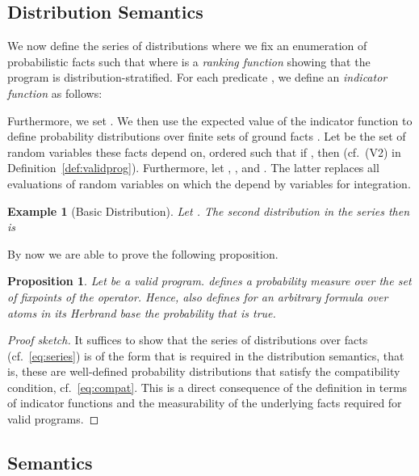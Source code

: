\documentclass{tlp}
\newtheorem{example}{Example}
\newtheorem{proposition}{Proposition}
\begin{document}
\subsection{Distribution Semantics}
\label{sec:distributionsemantics}

We now define the series of distributions  where we fix an
enumeration  of probabilistic facts such that  where  is a
\emph{ranking function} showing that the program is
distribution-stratified.  For each predicate , we define an \emph{indicator function} as follows:


Furthermore, we set .
We then use the expected value of the indicator function to define
probability distributions  over finite sets of ground facts
. Let  be the set of random
variables these  facts depend on, ordered such that if
, then  (cf.~(V2) in
Definition~\ref{def:validprog}).  Furthermore, let , , and . The latter replaces all
evaluations of random variables on which the  depend by variables
for integration.

\begin{example}[Basic Distribution]
Let . The second distribution in the
series then is
 
\end{example}

By now we are able to prove the following proposition.

\begin{proposition}
  \label{prop:adm}
  Let  be a valid program.   defines a probability measure 
  over the set of fixpoints of the  operator.  Hence,  also
  defines for an arbitrary formula  over atoms in its
  Herbrand base the probability that  is true.
\end{proposition}

\begin{proof}[Proof sketch] 
  It suffices to show that the series of distributions 
  over facts (cf.~\eqref{eq:series}) is of the form that is
  required in the distribution semantics, that is, these are
  well-defined probability distributions that satisfy the
  compatibility condition, cf.~\eqref{eq:compat}. This is a direct
  consequence of the definition in terms of indicator functions and
  the measurability of the underlying facts required for valid
  programs.
\end{proof}


\subsection{ Semantics}
\label{sec:tp}
\end{document}
